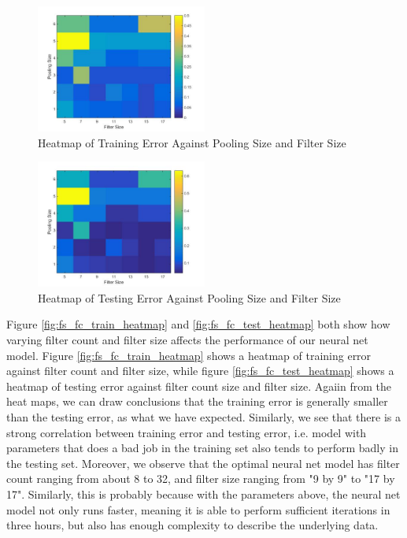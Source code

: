 \documentclass[10pt,twocolumn]{article}
\begin{document}
\begin{figure}
\centering
\includegraphics[width = 0.5\textwidth]{figure/ps_fs_train_heatmap}
\caption{Heatmap of Training Error Against Pooling Size and Filter Size}
\label{fig:ps_fs_train_heatmap}
\end{figure}

\begin{figure}
\centering
\includegraphics[width = 0.5\textwidth]{figure/ps_fs_test_heatmap}
\caption{Heatmap of Testing Error Against Pooling Size and Filter Size}
\label{fig:ps_fs_test_heatmap}
\end{figure}

Figure \ref{fig:fs_fc_train_heatmap} and \ref{fig:fs_fc_test_heatmap} both show how varying filter count and filter size affects the performance of our neural net model. Figure \ref{fig:fs_fc_train_heatmap}  shows a heatmap of training error against filter count and filter size, while figure \ref{fig:fs_fc_test_heatmap} shows a heatmap of testing error against filter count size and filter size. Agaiin from the heat maps, we can draw conclusions that the training error is generally smaller than the testing error, as what we have expected. Similarly, we see that there is a strong correlation between training error and testing error, i.e. model with parameters that does a bad job in the training set also tends to perform badly in the testing set. Moreover, we observe that the optimal neural net model has filter count ranging from about 8 to 32, and filter size ranging from "9 by 9" to "17 by 17". Similarly, this is probably because with the parameters above, the neural net model not only runs faster, meaning it is able to perform sufficient iterations in three hours, but also has enough complexity to describe the underlying data.
\end{document}
